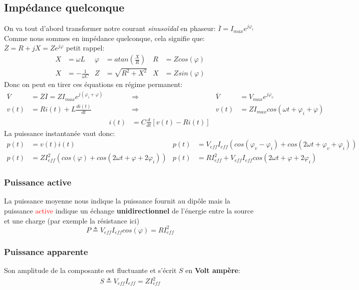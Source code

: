 \documentclass{report}
\begin{document}
\subsection{Impédance quelconque}
On va tout d'abord transformer notre courant \textit{sinusoïdal} en phaseur: $\overline{I} = I_{max}e^{j\varphi_i}$\\
Comme nous sommes en impédance quelconque, cela signifie que: $\overline{Z} = R + j X = Z e^{j \varphi}$ petit rappel:
\begin{align*}
X &= \omega L & \varphi &= atan(\frac{X}{R}) & R &= Z cos(\varphi)\\
X &=  -\frac{1}{\omega C} & Z &= \sqrt{R^2 + X^2} & X &= Z sin(\varphi)
\end{align*}
Donc on peut en tirer ces équations en régime permanent:
\begin{align*}
\overline{V} &= \overline{Z} \overline{I}  = Z I_{max}e^{j (\varphi_i + \varphi)} & &\Rightarrow & \overline{V} &= V_{max}e^{j\varphi_v}\\
v(t) &= Ri(t) + L \frac{di(t)}{dt} & &\Rightarrow & v(t) &= Z I_{max} cos(\omega t + \varphi_i + \varphi)\\
& & i(t) &= C\frac{d}{dt}[v(t) -Ri(t)] & &
\end{align*}
La puissance instantanée vaut donc:
\begin{align*}
p(t) &= v(t) i(t) & p(t) &= V_{eff} I_{eff}(cos(\varphi_v - \varphi_i) + cos(2 \omega t + \varphi_v + \varphi_i ))\\
p(t) &= ZI_{eff}^2(cos(\varphi ) + cos(2 \omega t + \varphi + 2\varphi_i )) & p(t) &= RI_{eff}^2 + V_{eff}I_{eff} cos(2 \omega t + \varphi + 2\varphi_i )
\end{align*}

\subsubsection{Puissance active}
La puissance moyenne nous indique la puissance fournit au dipôle mais la puissance \textcolor{red}{active} indique un échange \textbf{unidirectionnel} de l'énergie entre la source et une charge (par exemple la résistance ici)
\begin{equation}
P \triangleq V_{eff} I_{eff} cos(\varphi) = R I_{eff}^2
\end{equation}

\subsubsection{Puissance apparente}
Son amplitude de la composante est fluctuante et s'écrit $S$ en \textbf{Volt ampère}:
\begin{align*}
S \triangleq V_{eff} I_{eff} = Z I_{eff}^2
\end{align*}
\end{document}
